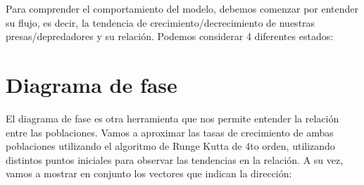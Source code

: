 \documentclass{article}
\begin{document}
Para comprender el comportamiento del modelo, debemos comenzar por entender su flujo, es decir, la tendencia de crecimiento/decrecimiento de nuestras presas/depredadores y su relación.
Podemos considerar 4 diferentes estados:

\begin{center}
\end{center}

\section{Diagrama de fase}

El diagrama de fase es otra herramienta que nos permite entender la relación entre las poblaciones. Vamos a aproximar las tasas de crecimiento de ambas poblaciones utilizando el algoritmo de Runge Kutta de 4to orden, utilizando distintos puntos iniciales para observar las tendencias en la relación. A su vez, vamos a mostrar en conjunto los vectores que indican la dirección:
\end{document}
